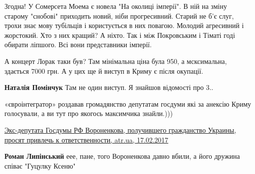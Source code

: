 \begin{itemize}
Згодна! У Сомерсета Моема є новела "На околиці імперії". В ній на зміну старому
"снобові" приходить новий, ніби прогресивний. Старий не б'є слуг, трохи знає
мову тубільців і користується в них повагою. Молодий агресивний і жорстокий.
Хто з них кращий? А ніхто. Так і між Покровським і Тіматі годі обирати ліпшого.
Всі вони представники імперії.


 

А концерт Лорак таки був? Там мінімальна ціна була 950, а мсксимальна, здається
7000 грн. А у цих ще й виступ в Криму є після окупації.

\begin{itemize}
 
\textbf{Наталія Помінчук} Там не один виступ. Я знайшов відомості про 3..
\end{itemize}

 

«євроінтегратор» роздавав громадянство депутатам госдуми які за анексію Криму
голосували, а ви тут про якогось максимчика знайли.)))

\href{https://atr.ua/news/169095-eks-deputata-gosdumy-rf-voronenkova-poluchivshego-grazhdanstvo-ukrainy-prosyat-privlech-k-otvetstvennosti}{%
Экс-депутата Госдумы РФ Вороненкова, получившего гражданство Украины, просят привлечь к ответственности, %
atr.ua, 17.02.2017%
}

\begin{itemize}
 
\textbf{Роман Липінський} еее, пане, того Вороненкова давно вбили, а його дружина співає "Гуцулку Ксеню"


\end{itemize}
\end{itemize}
